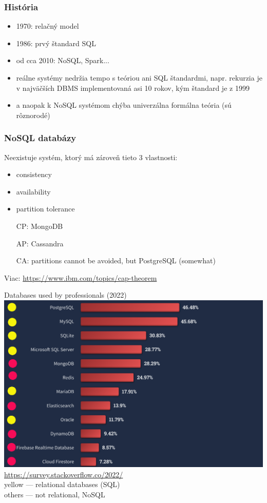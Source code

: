 \documentclass[12pt]{beamer}
\begin{document}
\begin{frame}
\frametitle{História}
\begin{itemize}
\item 1970: relačný model
\item 1986: prvý štandard SQL
\item od cca 2010: NoSQL, Spark...
\pause
\item reálne systémy nedržia tempo s teóriou ani SQL štandardmi,
    napr. rekurzia je v najväčších DBMS implementovaná asi 10 rokov, kým štandard je z 1999
\item a naopak k NoSQL systémom chýba univerzálna formálna teória (sú rôznorodé)
\end{itemize}
\end{frame}

\begin{frame}
\frametitle{NoSQL databázy}
\begin{theorem}
Neexistuje systém, ktorý má zároveň tieto 3 vlastnosti:
\begin{itemize}
\item consistency
\item availability
\item partition tolerance
\end{itemize}
\end{theorem}
\begin{itemize}
\item[CP:] MongoDB
\item[AP:] Cassandra
\item[CA:] partitions cannot be avoided, but PostgreSQL (somewhat)
\end{itemize}
{\scriptsize Viac: \url{https://www.ibm.com/topics/cap-theorem}}
\end{frame}


\begin{frame}{Databases used by professionals (2022)}
\includegraphics[scale=.15]{commondb_modified.png}\\
{\tiny \url{https://survey.stackoverflow.co/2022/}}\\[3mm]
{\small yellow --- relational databases (SQL)}\\
{\small others --- not relational, NoSQL}
\end{frame}
\end{document}
